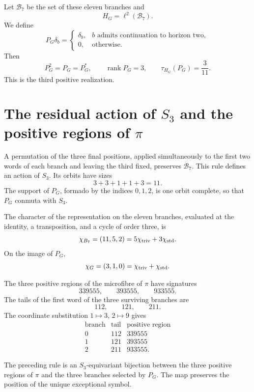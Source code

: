 Let \(\mathcal B_7\) be the set of these eleven branches and
\[
 H_G=\ell^2(\mathcal B_7).
\]
We define
\[
 P_G\delta_b=
 \begin{cases}
 \delta_b,&b\text{ admits continuation to horizon two},\\
 0,&\text{otherwise}.
 \end{cases}
\]
Then
\[
 P_G^2=P_G=P_G^*,
 \qquad
 \operatorname{rank}P_G=3,
 \qquad
 \boxed{\tau_{H_G}(P_G)=\frac3{11}.}
\]
This is the third positive realization.

\section{The residual action of \texorpdfstring{\(S_3\)}{S3} and the positive regions of \texorpdfstring{\(\pi\)}{pi}}

A permutation of the three final positions, applied simultaneously to
the first two words of each branch and leaving the third fixed, preserves
\(\mathcal B_7\). This rule defines an action of \(S_3\). Its orbits
have sizes
\[
 3+3+1+1+3=11.
\]
The support of \(P_G\), formado by the indices \(0,1,2\), is one orbit
complete, so that \(P_G\) conmuta with \(S_3\).

The character of the representation on the eleven branches, evaluated at the identity,
a transposition, and a cycle of order three, is
\[
 \chi_{\mathcal B_7}=(11,5,2)
 =5\chi_{\rm triv}+3\chi_{\rm std}.
\]
On the image of \(P_G\),
\[
 \chi_G=(3,1,0)
 =\chi_{\rm triv}+\chi_{\rm std}.
\]

The three positive regions of the microfibre of \(\pi\) have signatures
\[
 339555,\qquad393555,\qquad933555.
\]
The tails of the first word of the three surviving branches are
\[
 112,\qquad121,\qquad211.
\]
The coordinate substitution \(1\mapsto3\), \(2\mapsto9\) gives
\[
\begin{array}{c|c|c}
\text{branch}&\text{tail}&\text{positive region}\\ \hline
0&112&339555\\
1&121&393555\\
2&211&933555.
\end{array}
\]

\begin{theorem}
\label{thm:puente-pi-puerta-s3}
The preceding rule is an \(S_3\)-equivariant bijection between the three
positive regions of \(\pi\) and the three branches selected by \(P_G\).
The map preserves the position of the unique exceptional symbol.
\end{theorem}

